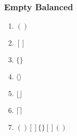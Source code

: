 \documentclass{article}
\begin{document}
\subsubsection{Empty Balanced}
\begin{enumerate}
  \item $()$
  \item $[]$
  \item $\{\}$
  \item $\langle\rangle$
  \item $\lfloor\rfloor$
  \item $\lceil\rceil$
  \item $()[]\{\}[]()$ %
\end{enumerate}
\end{document}
